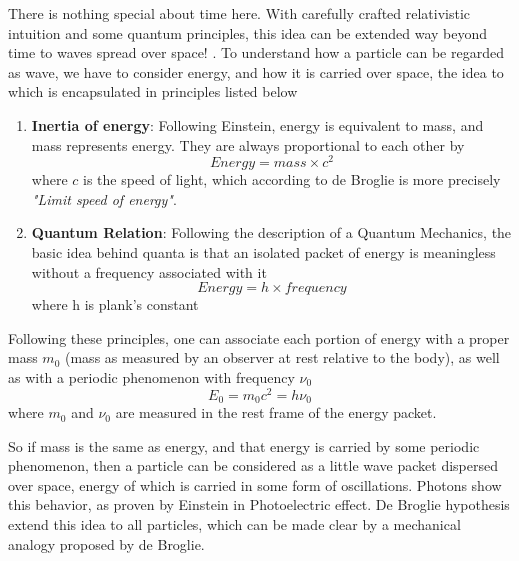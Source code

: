 \documentclass[11pt, a4paper]{article}
\begin{document}
There is nothing special about time here. With carefully crafted relativistic intuition and some quantum principles, this idea can be extended way beyond time to waves spread over space! \cite{de_broglie_thesis}. To understand how a particle can be regarded as wave, we have to consider energy, and how it is carried over space, the idea to which is encapsulated in principles listed below
\begin{enumerate}
	\item \textbf{Inertia of energy}: Following Einstein, energy is equivalent to mass, and mass represents energy. They are always proportional to each other by
	\begin{equation*}
		Energy = mass \times c^{2}
	\end{equation*}
	where $c$ is the speed of light, which according to de Broglie is more precisely \textit{"Limit speed of energy"}.
	\item \textbf{Quantum Relation}: Following the description of a Quantum Mechanics, the basic idea behind quanta is that an isolated packet of energy is meaningless without a frequency associated with it
	\begin{equation*}
		Energy = h \times frequency
	\end{equation*}
	where h is plank's constant
\end{enumerate}
Following these principles, one can associate each portion of energy with a proper mass $m_{0}$ (mass as measured by an observer at rest relative to the body), as well as with a periodic phenomenon with frequency $\nu_{0}$ 
\begin{equation*}
	E_{0} = m_{0}c^{2} = h \nu_{0}
\end{equation*}
where $m_{0}$ and $\nu_{0}$ are measured in the rest frame of the energy packet.

So if mass is the same as energy, and that energy is carried by some periodic phenomenon, then a particle can be considered as a little wave packet dispersed over space, energy of which is carried in some form of oscillations. Photons show this behavior, as proven by Einstein in Photoelectric effect. De Broglie hypothesis extend this idea to all particles, which can be made clear by a mechanical analogy proposed by de Broglie.
\end{document}
